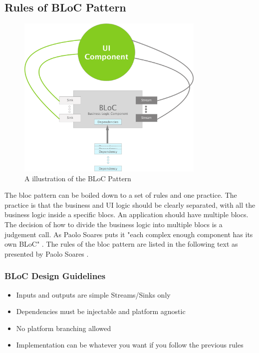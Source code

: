 \subsection{Rules of BLoC Pattern}
\begin{figure}[h]
    \centering
    \includegraphics[width=0.8\textwidth]{figures/BLoCPattern.png}
    \caption{A illustration of the BLoC Pattern}
    \label{fig:blocPattern}
\end{figure}

The \gls{bloc} pattern can be boiled down to a set of rules and one practice. The practice is that the business and UI logic should be clearly separated, with all the business logic inside a specific \glspl{bloc}. An application should have multiple \glspl{bloc}. The decision of how to divide the business logic into multiple \glspl{bloc} is a judgement call. As Paolo Soares puts it "each complex enough component has its own BLoC" \cite[24 min 15 sec]{blocPattern}. The rules of the \gls{bloc} pattern are listed in the following text as presented by Paolo Soares \cite[22 min 25 sec]{blocPattern}.

\subsubsection{BLoC Design Guidelines} \label{subsubsec: Bloc_design_guidelines}
\begin{itemize}
  \item Inputs and outputs are simple Streams/Sinks only
  \item Dependencies must be injectable and platform agnostic
  \item No platform branching allowed
  \item Implementation can be whatever you want if you follow the previous rules
\end{itemize}

